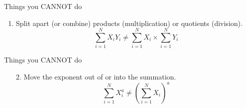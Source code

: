 \documentclass{./../div_teaching_slides}
\begin{document}
\begin{frame}{Things you CANNOT do}
\begin{enumerate}
\item Split apart (or combine) products (multiplication) or quotients (division).
$$ \sum_{i=1}^N X_i Y_i \neq  \sum_{i=1}^N X_i \times \sum_{i=1}^N Y_i   $$
\end{enumerate}
\end{frame}

\begin{frame}{Things you CANNOT do}
\begin{enumerate}
\item[2.] Move the exponent out of or into the summation.
$$ \sum_{i=1}^N X_i^a \neq  \left(\sum_{i=1}^N X_i\right)^a $$
\end{enumerate}
\end{frame}
\end{document}
